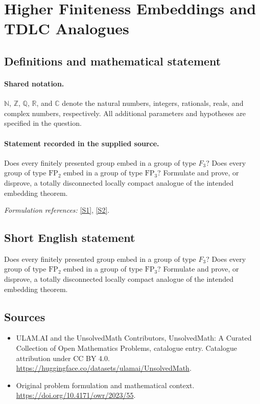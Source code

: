 \documentclass[11pt]{article}
\newcommand{\sref}[2]{\hyperlink{source:#1:#2}{[S#2]}}
\begin{document}
\section{Higher Finiteness Embeddings and TDLC Analogues}\label{statement}

\subsection{Definitions and mathematical statement}

\paragraph{Shared notation.}$\mathbb N$, $\mathbb Z$, $\mathbb Q$, $\mathbb R$, and $\mathbb C$ denote the natural numbers, integers, rationals, reals, and complex numbers, respectively. All additional parameters and hypotheses are specified in the question.


\paragraph{Statement recorded in the supplied source.}
Does every finitely presented group embed in a group of type $F_3$? Does every group of type $\mathrm{FP}_2$ embed in a group of type $\mathrm{FP}_3$? Formulate and prove, or disprove, a totally disconnected locally compact analogue of the intended embedding theorem.
\par\smallskip\textit{Formulation references:} \sref{statement}{1}, \sref{statement}{2}.
\subsection{Short English statement}
Does every finitely presented group embed in a group of type $F_3$? Does every group of type $\mathrm{FP}_2$ embed in a group of type $\mathrm{FP}_3$? Formulate and prove, or disprove, a totally disconnected locally compact analogue of the intended embedding theorem.
\subsection{Sources}
\begin{itemize}
\item[\hypertarget{source:statement:1}{S1}] ULAM.AI and the UnsolvedMath Contributors, UnsolvedMath: A Curated Collection of Open Mathematics Problems, catalogue entry. Catalogue attribution under CC BY 4.0.
\url{https://huggingface.co/datasets/ulamai/UnsolvedMath}.
\item[\hypertarget{source:statement:2}{S2}] Original problem formulation and mathematical context.
\url{https://doi.org/10.4171/owr/2023/55}.
\end{itemize}
\label{end:statement}
\end{document}
